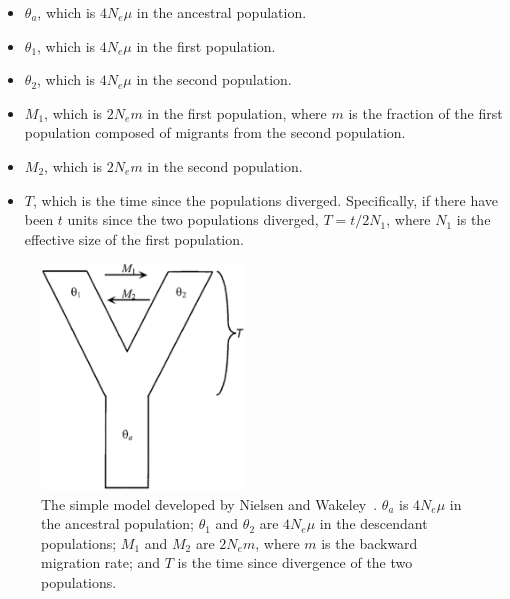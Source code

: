 \begin{itemize}

\item $\theta_a$, which is $4N_e\mu$ in the ancestral population.

\item $\theta_1$, which is $4N_e\mu$ in the first population.

\item $\theta_2$, which is $4N_e\mu$ in the second population.

\item $M_1$, which is $2N_em$ in the first population, where $m$ is
  the fraction of the first population composed of migrants from the
  second population.

\item $M_2$, which is $2N_em$ in the second population.

\item $T$, which is the time since the populations
  diverged. Specifically, if there have been $t$ units since
  the two populations diverged, $T=t/2N_1$, where $N_1$ is the
  effective size of the first population.

\end{itemize}

\begin{figure}
\begin{center}
\includegraphics[height=6cm]{nielsen-wakeley.eps}
\end{center}
\caption{The simple model developed by Nielsen and
  Wakeley~\cite{Nielsen-Wakeley-2001}. $\theta_a$ is $4N_e\mu$ in the
  ancestral population; $\theta_1$ and $\theta_2$ are $4N_e\mu$ in the
  descendant populations; $M_1$ and $M_2$ are $2N_em$, where $m$ is
  the backward migration rate; and $T$ is the time since divergence of
  the two populations.}\label{fig:nielsen-wakeley}
\end{figure}

